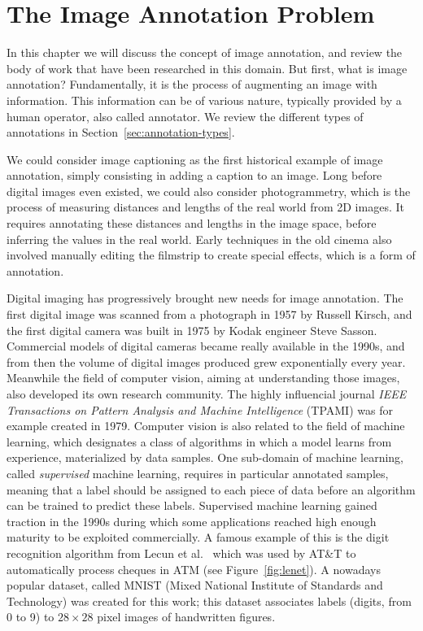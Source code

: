 \chapter{The Image Annotation Problem}%
\label{cha:the_image_annotation_problem}

\adjustmtc
\minitoc%

\newpage
In this chapter we will discuss the concept of image annotation,
and review the body of work that have been researched in this domain.
But first, what is image annotation?
Fundamentally, it is the process of augmenting an image with information.
This information can be of various nature,
typically provided by a human operator, also called annotator.
We review the different types of annotations in Section~\ref{sec:annotation-types}.

We could consider image captioning as the first historical example of image annotation,
simply consisting in adding a caption to an image.
Long before digital images even existed, we could also consider photogrammetry,
which is the process of measuring distances and lengths of the real world from 2D images.
It requires annotating these distances and lengths in the image space,
before inferring the values in the real world.
Early techniques in the old cinema also involved
manually editing the filmstrip to create special effects, which is a form of annotation.

Digital imaging has progressively brought new needs for image annotation.
The first digital image was scanned from a photograph in 1957 by Russell Kirsch,
and the first digital camera was built in 1975 by Kodak engineer Steve Sasson.
Commercial models of digital cameras became really available in the 1990s,
and from then the volume of digital images produced grew exponentially every year.
Meanwhile the field of computer vision, aiming at understanding those images,
also developed its own research community.
The highly influencial journal \textit{IEEE Transactions on Pattern Analysis
and Machine Intelligence} (TPAMI) was for example created in 1979.
Computer vision is also related to the field of machine learning,
which designates a class of algorithms in which a model learns from experience,
materialized by data samples.
One sub-domain of machine learning, called \textit{supervised} machine learning,
requires in particular annotated samples,
meaning that a label should be assigned to each piece of data before
an algorithm can be trained to predict these labels.
Supervised machine learning gained traction in the 1990s during which
some applications reached high enough maturity to be exploited commercially.
A famous example of this is the digit recognition algorithm from
Lecun et al.~\cite{lecun1998gradient} which was used by AT\&T
to automatically process cheques in ATM (see Figure~\ref{fig:lenet}).
A nowadays popular dataset,
called MNIST (Mixed National Institute of Standards and Technology)
was created for this work;
this dataset associates labels (digits, from 0 to 9)
to $28\times 28$ pixel images of handwritten figures.

